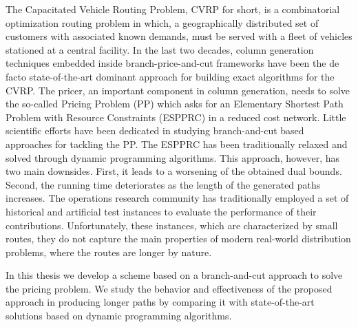 \noindent The Capacitated Vehicle Routing Problem, CVRP for short,
is a combinatorial optimization routing problem in which,
a geographically distributed set of customers with associated known demands,
must be served with a fleet of vehicles stationed at a central facility.
In the last two decades,
column generation techniques embedded inside branch-price-and-cut frameworks
have been the de facto state-of-the-art dominant approach
for building exact algorithms for the CVRP.
The pricer, an important component in column generation, needs to solve
the so-called Pricing Problem (PP) which asks for an
Elementary Shortest Path Problem with Resource Constraints (ESPPRC)
in a reduced cost network.
Little scientific efforts have been dedicated in studying
branch-and-cut based approaches for tackling the PP.
The ESPPRC has been traditionally relaxed and solved through dynamic programming
algorithms. This approach, however, has two main downsides.
First, it leads to a worsening of the obtained dual bounds.
Second, the running time deteriorates as the length of the generated paths increases.
The operations research community has traditionally employed
a set of historical and artificial test instances to evaluate
the performance of their contributions.
Unfortunately, these instances, which are characterized by small routes,
they do not capture the main properties of modern real-world distribution problems,
where the routes are longer by nature.

\noindent In this thesis we develop
a scheme based on a branch-and-cut approach to solve the pricing problem.
We study the behavior and effectiveness of the proposed approach in producing longer paths
by comparing it with state-of-the-art solutions based on dynamic programming algorithms.
